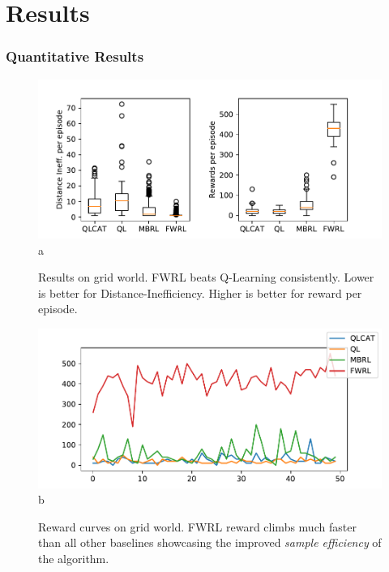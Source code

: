 \section{Results}
\subsubsection{Quantitative Results}

\begin{figure}%
    \begin{minipage}{\columnwidth}
        \includegraphics[width=\columnwidth]{./media/metrics-grid-world.pdf}{a}
        \caption{Results on grid world. FWRL beats Q-Learning
        consistently. Lower is better for Distance-Inefficiency. Higher
        is better for reward per episode. }
      \label{fig:ql-fw-grid-world-results}%
    \end{minipage}
    \begin{minipage}{\columnwidth}
        \includegraphics[width=\columnwidth]{./media/rewards-metrics-grid-world.pdf}{b}
        \caption{Reward curves on grid world. FWRL reward climbs much
        faster than all other baselines showcasing the improved \emph{sample
        efficiency} of the algorithm.}
      \label{fig:ql-fw-grid-world-reward-curves}%
    \end{minipage}
\end{figure}


